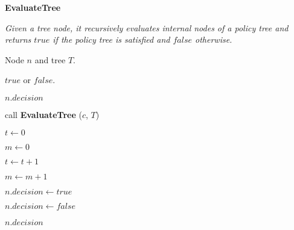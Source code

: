 \documentclass[epsfig,a4paper,11pt,titlepage]{book}
\numberwithin{algorithm}{chapter}
\newcommand{\algofontsize}{\fontsize{11}{12}\selectfont}
\begin{document}
\begin{algorithm} [htp]

{\algofontsize
\caption{\textbf{EvaluateTree}}

\label{algo:erbac-evaluate-tree}

\begin{algorithmic}[1]

\INPUT \emph{Given a tree node, it recursively evaluates internal nodes of a policy tree and returns $\mathit{true}$ if the policy tree is satisfied and $\mathit{false}$ otherwise.}

\Require Node $n$ and tree $T$.

\Ensure $\mathit{true}$ or $\mathit{false}$.

\medskip

 \label{line:erbac-evaluate-tree-if-null}

	\Return $\mathit{n.decision}$ \label{line:erbac-evaluate-tree-decision-not-null}
	
\EndIf

 \label{line:erbac-evaluate-tree-child-loop}
	
	\State call \textbf{EvaluateTree} ($c$, $T$) {\algofontsize {}} \label{line:erbac-evaluate-tree-call}
	
\EndFor

\State $t \leftarrow 0$ \label{line:erbac-evaluate-tree-init-t}

\State $m \leftarrow 0$ \label{line:erbac-evaluate-tree-init-m}

 \label{line:erbac-evaluate-tree-count-loop}

	\State $t \leftarrow t + 1$ \label{line:erbac-evaluate-tree-inc-t}
	
	 \label{line:erbac-evaluate-tree-find-decision}
	
		\State $m \leftarrow m + 1$ \label{line:erbac-evaluate-tree-inc-m}
		
	\EndIf

\EndFor

 \label{line:erbac-evaluate-tree-find-gate}

	\State $\mathit{n.decision} \leftarrow \mathit{true}$ \label{line:erbac-evaluate-tree-set-decision-true}
	
\Else

	\State $\mathit{n.decision} \leftarrow \mathit{false}$ \label{line:erbac-evaluate-tree-set-decision-false}
	
\EndIf

\Return $\mathit{n.decision}$ \label{line:erbac-evaluate-tree-return-decision}

\end{algorithmic}

}

\end{algorithm}
\end{document}
